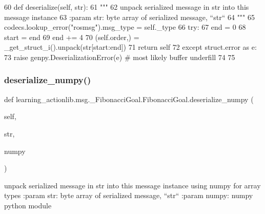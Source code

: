 \begin{DoxyCode}
60   \textcolor{keyword}{def }deserialize(self, str):
61     \textcolor{stringliteral}{"""}
62 \textcolor{stringliteral}{    unpack serialized message in str into this message instance}
63 \textcolor{stringliteral}{    :param str: byte array of serialized message, ``str``}
64 \textcolor{stringliteral}{    """}
65     codecs.lookup\_error(\textcolor{stringliteral}{"rosmsg"}).msg\_type = self.\_type
66     \textcolor{keywordflow}{try}:
67       end = 0
68       start = end
69       end += 4
70       (self.order,) = \_get\_struct\_i().unpack(str[start:end])
71       \textcolor{keywordflow}{return} self
72     \textcolor{keywordflow}{except} struct.error \textcolor{keyword}{as} e:
73       \textcolor{keywordflow}{raise} genpy.DeserializationError(e)  \textcolor{comment}{# most likely buffer underfill}
74 
75 
\end{DoxyCode}
\mbox{\label{classlearning__actionlib_1_1msg_1_1__FibonacciGoal_1_1FibonacciGoal_ae90de69fd85a2643e37a6be9f613b312}} 
\subsubsection{\texorpdfstring{deserialize\+\_\+numpy()}{deserialize\_numpy()}}
{\footnotesize\ttfamily def learning\+\_\+actionlib.\+msg.\+\_\+\+Fibonacci\+Goal.\+Fibonacci\+Goal.\+deserialize\+\_\+numpy (\begin{DoxyParamCaption}\item[{}]{self,  }\item[{}]{str,  }\item[{}]{numpy }\end{DoxyParamCaption})}

\begin{DoxyVerb}unpack serialized message in str into this message instance using numpy for array types
:param str: byte array of serialized message, ``str``
:param numpy: numpy python module
\end{DoxyVerb}
 

